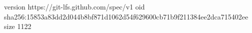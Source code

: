 version https://git-lfs.github.com/spec/v1
oid sha256:15853a83dd2d044b8bf871d1062d54f629600cb71b9f211384ee2dca715402ee
size 1122
